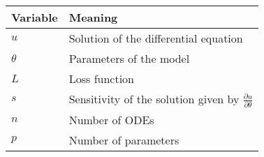 \setlength{\tabcolsep}{10pt} %
\renewcommand{\arraystretch}{1.2}
\begin{table}[H]
    \center
    \begin{tabular}{| p{3cm} | p{8cm} |}
    \hline
    Variable            & Meaning \\ [0.5ex] 
    \hline  
    $u$					& Solution of the differential equation \\
    $\theta$            & Parameters of the model \\
    $L$ 				& Loss function \\
    $s$                 & Sensitivity of the solution given by $\frac{\partial u}{\partial \theta}$ \\
    $n$                 & Number of ODEs \\
    $p$                 & Number of parameters \\
    \hline
\end{tabular}	
\end{table}
